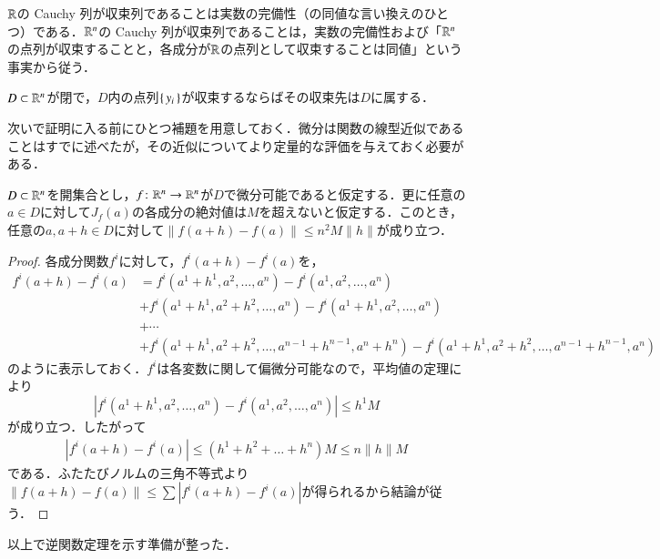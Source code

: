 \begin{que}
$\mathbb{R}$の Cauchy 列が収束列であることは実数の完備性（の同値な言い換えのひとつ）である．$\mathbb{R}^n$の Cauchy 列が収束列であることは，実数の完備性および「$\mathbb{R}^n$の点列が収束することと，各成分が$\mathbb{R}$の点列として収束することは同値」という事実から従う．
\end{que}

\begin{que}
$D \subset \mathbb{R}^n$が閉で，$D$内の点列$\set{y_i}$が収束するならばその収束先は$D$に属する．
\end{que}

次いで証明に入る前にひとつ補題を用意しておく．微分は関数の線型近似であることはすでに述べたが，その近似についてより定量的な評価を与えておく必要がある．

\begin{lem}\label{微分の定量評価}
$D \subset \mathbb{R}^n$を開集合とし，$f \colon \mathbb{R}^n \to \mathbb{R}^n$が$D$で微分可能であると仮定する．更に任意の$a \in D$に対して$J_f(a)$の各成分の絶対値は$M$を超えないと仮定する．このとき，任意の$a, a+h \in D$に対して$\|f(a+h) - f(a)\| \leq n^2M\|h\|$が成り立つ．
\end{lem}

\begin{proof}
各成分関数$f^i$に対して，$f^i(a+h) - f^i(a)$を，
\begin{align}
f^i(a+h) - f^i(a) &= f^i(a^1+h^1, a^2, \dots, a^n) - f^i(a^1 , a^2, \dots, a^n) \\
&+ f^i(a^1+h^1, a^2+h^2, \dots, a^n) - f^i(a^1+h^1 , a^2, \dots, a^n) \\
&+ \cdots \\
&+ f^i(a^1+h^1, a^2+h^2, \dots, a^{n-1}+h^{n-1} ,a^n+h^n) - f^i(a^1+h^1 , a^2+h^2, \dots, a^{n-1} +h^{n-1}, a^n)
\end{align}のように表示しておく．$f^i$は各変数に関して偏微分可能なので，平均値の定理により
\begin{equation}
|f^i(a^1+h^1, a^2, \dots, a^n) - f^i(a^1 , a^2, \dots, a^n)| \leq h^1 M
\end{equation}が成り立つ．したがって
\begin{align}
|f^i(a+h) - f^i(a)| \leq (h^1 + h^2 + \dots + h^n)M \leq n\|h\|M
\end{align}である．ふたたびノルムの三角不等式より$\|f(a+h) - f(a)\| \leq \sum |f^i(a + h) - f^i(a)|$が得られるから結論が従う．
\end{proof}

以上で逆関数定理を示す準備が整った．

